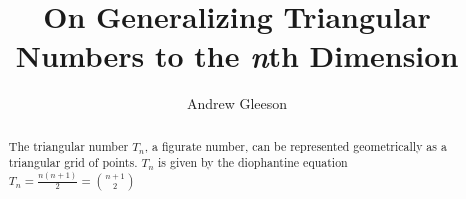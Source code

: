\documentclass{article}
\begin{document}
\title{On Generalizing Triangular Numbers to the \textit{n}th Dimension}
\author{Andrew Gleeson}

\maketitle

\begin{abstract}
The triangular number $T_{n}$, a figurate number, can be represented geometrically as a triangular grid of points. $T_{n}$ is given by the diophantine equation $T_{n} = \frac{n(n+1)}{2} = \binom{n+1}{2}$
\end{abstract}
\end{document}
